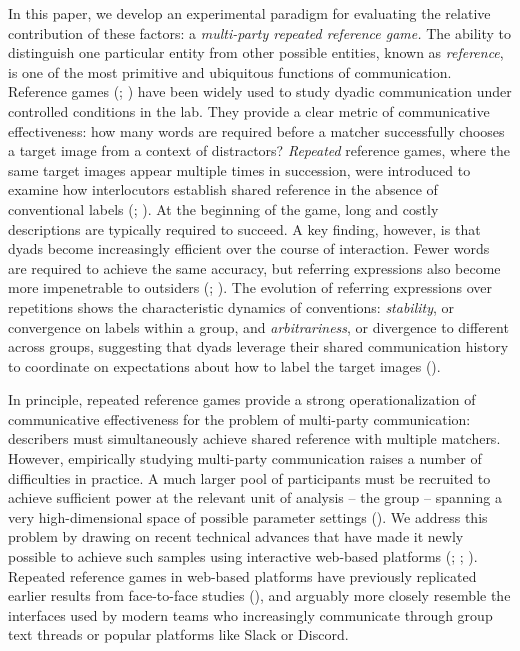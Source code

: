 \documentclass[
  english,
]{article}
\begin{document}
In this paper, we develop an experimental paradigm for evaluating the relative contribution of these factors: a \emph{multi-party repeated reference game.}
The ability to distinguish one particular entity from other possible entities, known as \emph{reference}, is one of the most primitive and ubiquitous functions of communication.
Reference games (; ) have been widely used to study dyadic communication under controlled conditions in the lab.
They provide a clear metric of communicative effectiveness: how many words are required before a matcher successfully chooses a target image from a context of distractors?
\emph{Repeated} reference games, where the same target images appear multiple times in succession, were introduced to examine how interlocutors establish shared reference in the absence of conventional labels (; ).
At the beginning of the game, long and costly descriptions are typically required to succeed.
A key finding, however, is that dyads become increasingly efficient over the course of interaction.
Fewer words are required to achieve the same accuracy, but referring expressions also become more impenetrable to outsiders (; ).
The evolution of referring expressions over repetitions shows the characteristic dynamics of conventions: \emph{stability}, or convergence on labels within a group, and \emph{arbitrariness}, or divergence to different across groups, suggesting that dyads leverage their shared communication history to coordinate on expectations about how to label the target images ().

In principle, repeated reference games provide a strong operationalization of communicative effectiveness for the problem of multi-party communication: describers must simultaneously achieve shared reference with multiple matchers.
However, empirically studying multi-party communication raises a number of difficulties in practice.
A much larger pool of participants must be recruited to achieve sufficient power at the relevant unit of analysis -- the group -- spanning a very high-dimensional space of possible parameter settings ().
We address this problem by drawing on recent technical advances that have made it newly possible to achieve such samples using interactive web-based platforms (; ; ).
Repeated reference games in web-based platforms have previously replicated earlier results from face-to-face studies (), and arguably more closely resemble the interfaces used by modern teams who increasingly communicate through group text threads or popular platforms like Slack or Discord.
\end{document}
